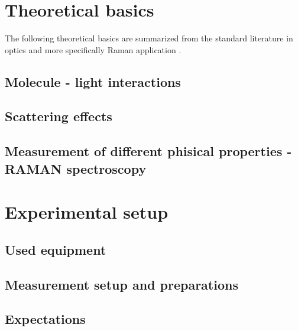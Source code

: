 
\chapter{Theoretical basics}
\label{chap:theoretical}

The following theoretical basics are summarized from the standard literature in optics \autocite{bornPrinciplesOpticsElectromagnetic1999,hechtOptik2005,lipsonOptik1997,niedrigOptikWellenUnd2004} and more specifically Raman application \autocite{herzbergMolecularSpectraMolecular2013,schraderInfraredRamanSpectroscopy1995}. 

\section{Molecule - light interactions}

\section{Scattering effects}

\section{Measurement of different phisical properties - RAMAN spectroscopy}

\chapter{Experimental setup}
\label{chap:experimental}

\section{Used equipment}

\section{Measurement setup and preparations}

\section{Expectations}

